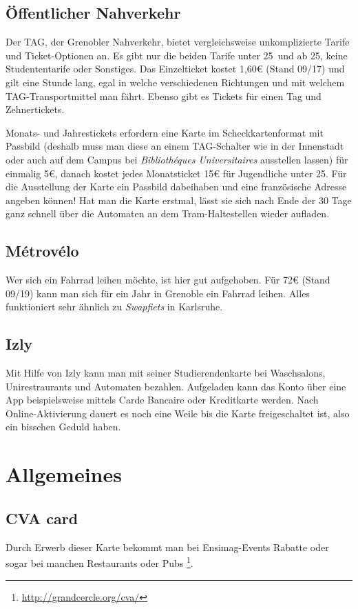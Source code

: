 \documentclass[11pt,a4paper]{article}
\begin{document}
	\subsection{Öffentlicher Nahverkehr}
	
	Der TAG, der Grenobler Nahverkehr, bietet vergleichsweise unkomplizierte Tarife und Ticket-Optionen an. Es gibt nur die beiden Tarife \glqq unter 25\grqq\ und \glqq ab 25\grqq , keine Studententarife oder Sonstiges. Das Einzelticket kostet 1,60€ (Stand 09/17) und gilt eine Stunde lang, egal in welche verschiedenen Richtungen und mit welchem TAG-Transportmittel man fährt. Ebenso gibt es Tickets für einen Tag und Zehnertickets.
	
	Monats- und Jahrestickets erfordern eine Karte im Scheckkartenformat mit Passbild (deshalb muss man diese an einem TAG-Schalter wie in der Innenstadt oder auch auf dem Campus bei \emph{Bibliothéques Universitaires} ausstellen lassen) für einmalig 5€, danach kostet jedes Monatsticket 15€ für Jugendliche unter 25. Für die Ausstellung der Karte ein Passbild dabeihaben und eine französische Adresse angeben können! Hat man die Karte erstmal, lässt sie sich nach Ende der 30 Tage ganz schnell über die Automaten an dem Tram-Haltestellen wieder aufladen.

  \subsection{Métrovélo}
  Wer sich ein Fahrrad leihen möchte, ist hier gut aufgehoben. Für 72€ (Stand 09/19) kann man sich für ein Jahr in Grenoble ein Fahrrad leihen. Alles funktioniert sehr ähnlich zu \textit{Swapfiets} in Karlsruhe.
	
	\subsection{Izly}
  Mit Hilfe von Izly kann man mit seiner Studierendenkarte bei Waschsalons, Unirestraurants und Automaten bezahlen. Aufgeladen kann das Konto über eine App beispielsweise mittels Carde Bancaire oder Kreditkarte werden. Nach Online-Aktivierung dauert es noch eine Weile bis die Karte freigeschaltet ist, also ein bisschen Geduld haben.


  \section{Allgemeines}
  \subsection{CVA card}
  Durch Erwerb dieser Karte bekommt man bei Ensimag-Events Rabatte oder sogar bei manchen Restaurants oder Pubs \footnote{\url{http://grandcercle.org/cva/}}.
\end{document}
